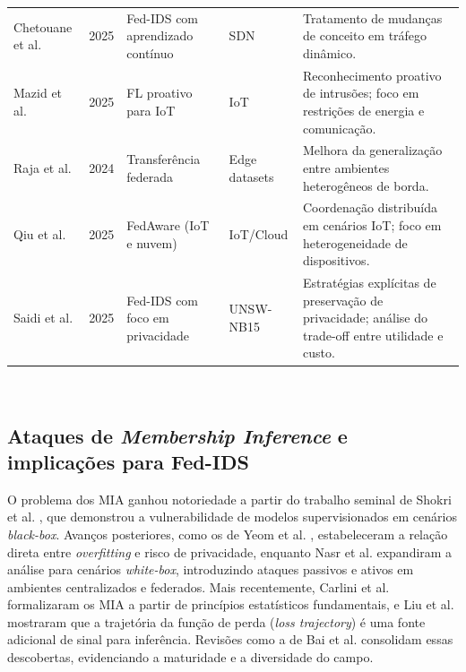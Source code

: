\documentclass[
	12pt,				%
	openright,			%
	oneside,			%
	a4paper,			%
	english,			%
	french,				%
	spanish,			%
	brazil,				%
	]{abntex2}
\begin{document}
\begin{table}[H]
\begin{tabular}{p{3.2cm}p{1.2cm}p{3.0cm}p{2.8cm}p{5.0cm}}
Chetouane et al. \cite{chetouane2025continualfedids} & 2025 & Fed-IDS com aprendizado contínuo & SDN & Tratamento de mudanças de conceito em tráfego dinâmico. \\
Mazid et al. \cite{mazid2025flidpp} & 2025 & FL proativo para IoT & IoT & Reconhecimento proativo de intrusões; foco em restrições de energia e comunicação. \\
Raja et al. \cite{raja2024transferfedids} & 2024 & Transferência federada & Edge datasets & Melhora da generalização entre ambientes heterogêneos de borda. \\
Qiu et al. \cite{qiu2025fedaware} & 2025 & FedAware (IoT e nuvem) & IoT/Cloud & Coordenação distribuída em cenários IoT; foco em heterogeneidade de dispositivos. \\
Saidi et al. \cite{saidi2025privacyfedids} & 2025 & Fed-IDS com foco em privacidade & UNSW-NB15 & Estratégias explícitas de preservação de privacidade; análise do trade-off entre utilidade e custo. \\
\bottomrule
\end{tabular}
\\[0.5em]
\end{table}



\subsection{Ataques de \textit{Membership Inference} e implicações para Fed-IDS}

O problema dos MIA ganhou notoriedade a partir do trabalho seminal de Shokri et al. \cite{shokri2017mia}, que demonstrou a vulnerabilidade de modelos supervisionados em cenários \textit{black-box}. Avanços posteriores, como os de Yeom et al. \cite{yeom2018privacyrisk}, estabeleceram a relação direta entre \textit{overfitting} e risco de privacidade, enquanto Nasr et al. \cite{nasr2019comprehensive} expandiram a análise para cenários \textit{white-box}, introduzindo ataques passivos e ativos em ambientes centralizados e federados. Mais recentemente, Carlini et al. \cite{carlini2022firstprinciples} formalizaram os MIA a partir de princípios estatísticos fundamentais, e Liu et al. \cite{liu2022trajectory} mostraram que a trajetória da função de perda (\textit{loss trajectory}) é uma fonte adicional de sinal para inferência. Revisões como a de Bai et al. \cite{bai2024survey} consolidam essas descobertas, evidenciando a maturidade e a diversidade do campo.
\end{document}
